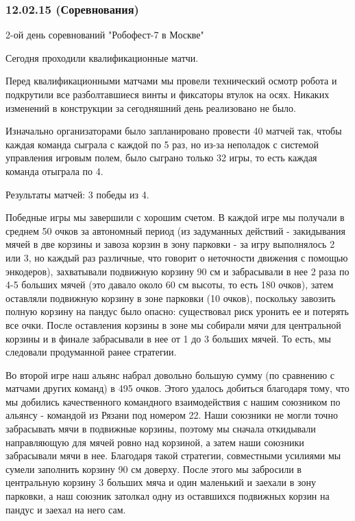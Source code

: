\subsubsection{12.02.15 (Соревнования)}
\begin{center}
	2-ой день соревнований "Робофест-7 в Москве"
\end{center}
Сегодня проходили квалификационные матчи. \newline

Перед квалификационными матчами мы провели технический осмотр робота и подкрутили все разболтавшиеся винты и фиксаторы втулок на осях. Никаких изменений в конструкции за сегодняшний день реализовано не было.\newline

Изначально организаторами было запланировано провести 40 матчей так, чтобы каждая команда сыграла с каждой по 5 раз, но из-за неполадок с системой управления игровым полем, было сыграно только 32 игры, то есть каждая команда отыграла по 4.\newline
 
Результаты матчей: 3 победы из 4.\newline

Победные игры мы завершили с хорошим счетом. В каждой игре мы получали в среднем 50 очков за автономный период (из задуманных действий - закидывания мячей в две корзины и завоза корзин в зону парковки - за игру выполнялось 2 или 3, но каждый раз различные, что говорит о неточности движения с помощью энкодеров), захватывали подвижную корзину 90 см  и забрасывали в нее 2 раза по 4-5 больших мячей (это давало около 60 см высоты, то есть 180 очков), затем оставляли подвижную корзину в зоне парковки (10 очков), поскольку завозить полную корзину на пандус было опасно: существовал риск уронить ее и потерять все очки. После оставления корзины в зоне мы собирали мячи для центральной корзины и в финале забрасывали в нее от 1 до 3 больших мячей. То есть, мы следовали продуманной ранее стратегии. \newline

Во второй игре наш альянс набрал довольно большую сумму (по сравнению с матчами других команд) в 495 очков. Этого удалось добиться благодаря тому, что мы добились качественного командного взаимодействия с нашим союзником по альянсу - командой из Рязани под номером 22. Наши союзники не могли точно забрасывать мячи в подвижные корзины, поэтому мы сначала откидывали направляющую для мячей ровно над корзиной, а затем наши союзники забрасывали мячи в нее. Благодаря такой стратегии, совместными усилиями мы сумели заполнить корзину 90 см доверху. После этого мы забросили в центральную корзину 3 больших мяча и один маленький и заехали в зону парковки, а наш союзник затолкал одну из оставшихся подвижных корзин на пандус и заехал на него сам.\newline

